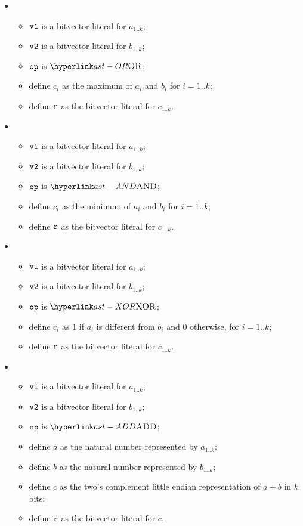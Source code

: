\begin{itemize}
  \item {}
  \begin{itemize}
    \item $\texttt{v1}$ is a bitvector literal for $a_{1..k}$;
    \item $\texttt{v2}$ is a bitvector literal for $b_{1..k}$;
    \item $\texttt{op}$ is $\OR$;
    \item define $c_i$ as the maximum of $a_i$ and $b_i$ for $i=1..k$;
    \item define $\texttt{r}$ as the bitvector literal for $c_{1..k}$.
  \end{itemize}

  \item {}
  \begin{itemize}
    \item $\texttt{v1}$ is a bitvector literal for $a_{1..k}$;
    \item $\texttt{v2}$ is a bitvector literal for $b_{1..k}$;
    \item $\texttt{op}$ is $\AND$;
    \item define $c_i$ as the minimum of $a_i$ and $b_i$ for $i=1..k$;
    \item define $\texttt{r}$ as the bitvector literal for $c_{1..k}$.
  \end{itemize}

  \item {}
  \begin{itemize}
    \item $\texttt{v1}$ is a bitvector literal for $a_{1..k}$;
    \item $\texttt{v2}$ is a bitvector literal for $b_{1..k}$;
    \item $\texttt{op}$ is $\XOR$;
    \item define $c_i$ as $1$ if $a_i$ is different from $b_i$ and $0$ otherwise, for $i=1..k$;
    \item define $\texttt{r}$ as the bitvector literal for $c_{1..k}$.
  \end{itemize}

  \item {}
  \begin{itemize}
    \item $\texttt{v1}$ is a bitvector literal for $a_{1..k}$;
    \item $\texttt{v2}$ is a bitvector literal for $b_{1..k}$;
    \item $\texttt{op}$ is $\ADD$;
    \item define $a$ as the natural number represented by $a_{1..k}$;
    \item define $b$ as the natural number represented by $b_{1..k}$;
    \item define $c$ as the two's complement little endian representation of $a+b$ in $k$ bits;
    \item define $\texttt{r}$ as the bitvector literal for $c$.
  \end{itemize}


\end{itemize}
